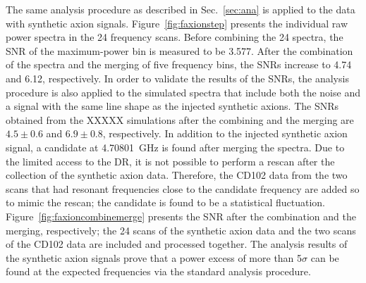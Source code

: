 The same analysis procedure as described in Sec.~\ref{sec:ana} is applied 
to the data with synthetic axion signals. 
Figure~\ref{fig:faxionstep} presents the individual raw power spectra in 
the 24 frequency scans. Before combining 
the 24 spectra, the SNR of the maximum-power bin is measured to be 
3.577. %
After the combination of the spectra and the merging of five frequency 
bins, the SNRs increase to 4.74 and 6.12, respectively. In order to 
validate the results of the SNRs, the analysis procedure is also applied 
to the simulated spectra that include both the noise and a signal with the 
same line shape as the injected synthetic axions. 
The SNRs obtained from 
the XXXXX simulations after the combining and the merging are %
$4.5\pm0.6$ and $6.9\pm0.8$, respectively. 
In addition to the 
injected synthetic axion signal, a candidate at 4.70801~GHz is found after 
merging the spectra. Due to the limited access to the DR, 
it is not possible to perform a rescan after the collection of the 
synthetic axion data. Therefore,  
the CD102 data from the two scans that had resonant frequencies close to 
the candidate frequency are added so to mimic the rescan; the candidate is 
found to be a statistical fluctuation.  
Figure~\ref{fig:faxioncombinemerge} presents 
the SNR %
after the combination and the merging, respectively;    
the 24 scans of the 
synthetic axion data and the two 
scans of the CD102 data are included and processed together. 
The analysis results of the synthetic axion signals prove that a power 
excess of more than 5$\sigma$ can be found at the expected frequencies via 
the standard analysis procedure.  

